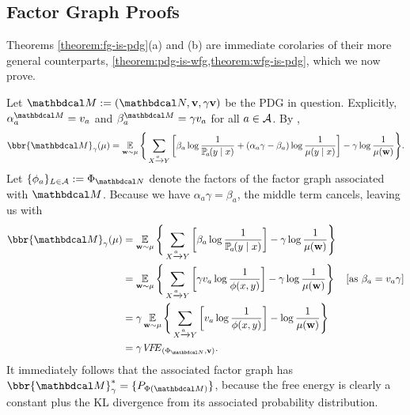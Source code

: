 \begin{subappendices}
\subsection{Factor Graph Proofs}
    \label{proof:pdg-is-fg}\label{proof:fg-is-pdg}%
Theorems \ref{theorem:fg-is-pdg}(a) and (b) are immediate corolaries of their
more general counterparts, \cref{theorem:pdg-is-wfg,theorem:wfg-is-pdg}, which
we now prove. 


\begin{lproof}\label{proof:pdg-is-wfg}
	Let $\dg M := (\dg N, \mat v, \gamma \mat v)$ be the PDG in question.
	Explicitly, $\alpha^{\dg M}_a = v_a$ and $\beta_a^{\dg M} =  \gamma v_a$ for all $a \in \mathcal A$.
	By ,
	\[ \bbr{\dg M}_\gamma(\mu)= \Ex_{\mat w \sim \mu} \Bigg\{   \sum_{ X \xrightarrow{\!\!a} Y  } \left[
		\beta_a \log \frac{1}{\p_a(y\mid x)} + (
			\alpha_a
		\gamma - \beta_a ) \log \frac{1}{\mu(y \mid x)}
					\right] - \gamma \log \frac{1}{\mu(\mat w)}
			\Bigg\}.  \]
	Let $\{\phi_a\}_{L \in \Ar} := \Phi_{\dg N}$ denote the
			factors of the factor graph associated with $\dg M$. 
	Because we have $\alpha_a\gamma  = \beta_a$, the middle term cancels, leaving us with
	\begin{align*}
	\bbr{\dg M}_\gamma(\mu) &= \Ex_{\mat w \sim \mu} \Bigg\{   \sum_{ X \xrightarrow{\!\!a} Y  } \left[
		\beta_a \log \frac{1}{\p_a(y\mid x)} \right] - \gamma \log \frac{1}{\mu(\mat w)} \Bigg\} \\
		&= \Ex_{\mat w \sim \mu} \Bigg\{   \sum_{ X \xrightarrow{\!\!a} Y  } \left[
	\gamma v_a \log \frac{1}{\phi(x,y)}  \right] - \gamma \log \frac{1}{\mu(\mat w)} \Bigg\} 
					&\text{[as $\beta_a = v_a \gamma$]}\\
		&= \gamma \Ex_{\mat w \sim \mu} \Bigg\{   \sum_{ X \xrightarrow{\!\!a} Y  } \left[
v_a \log \frac{1}{\phi(x,y)}
			 \right] -\log \frac{1}{\mu(\mat w)} \Bigg\} \\
			&= \gamma \VFE_{(\FGof{\dg N}, \mat v)}. 
	\end{align*}
	It immediately follows that the associated factor graph has 
	$\bbr{\dg M}^*_\gamma
 	= \{\Pr_{\Phi(\dg M)}\}$, because the free energy is clearly a constant plus the KL divergence from its associated probability distribution.
\end{lproof}


\end{subappendices}
